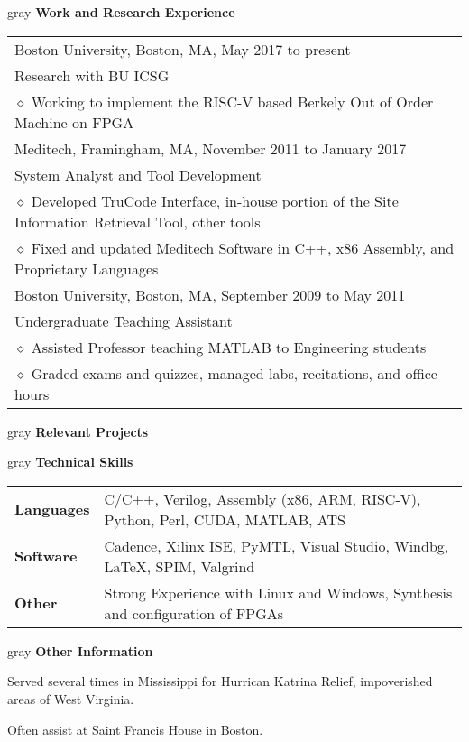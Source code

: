 \documentclass[11pt,letterpaper]{article}
\newcommand{\pseudoitem}{\diamond}
\newcommand{\vertspace}{\vspace{1.2mm}}
\newcommand{\horzindent}{\hspace{3mm}}
\newcommand{\minoritem}{\hspace{4.5mm} $\pseudoitem$ }
\newcommand{\latex}{\LaTeX\space}
\newcommand{\undergrad}{Boston University}
\newcommand{\grad}{Boston University}
\begin{document}
	\vertspace
	\noindent
	\begin{heading}{gray}
		\textbf{Work and Research Experience} 
	\end{heading}
		\begin{tabular}{l}
			\grad , Boston, MA, May 2017 to present\\
			\horzindent Research with BU ICSG\\
			\minoritem Working to implement the RISC-V based Berkely Out of Order Machine on FPGA\\
			Meditech, Framingham, MA, November 2011 to January 2017\\
			\horzindent System Analyst and Tool Development \\
			\minoritem Developed TruCode Interface, in-house portion of the Site Information Retrieval Tool, other tools \\
			\minoritem Fixed and updated Meditech Software in C++, x86 Assembly, and Proprietary Languages \\
			\undergrad , Boston, MA, September 2009 to May 2011 \\
			\horzindent Undergraduate Teaching Assistant \\
			\minoritem Assisted Professor teaching MATLAB to Engineering students \\
			\minoritem Graded exams and quizzes, managed labs, recitations, and office hours \\
		\end{tabular}
		
	\vertspace
	\noindent
	\begin{heading}{gray}
		\textbf{Relevant Projects}
	\end{heading}
	
	\vertspace
	\noindent
	\begin{heading}{gray}
		\textbf{Technical Skills}
	\end{heading}
	\begin{tabular}{l|l}
		\textbf{Languages} & C/C++, Verilog, Assembly (x86, ARM, RISC-V), Python, Perl, CUDA, MATLAB, ATS \\
		\textbf{Software} & Cadence, Xilinx ISE, PyMTL, Visual Studio, Windbg, \latex, SPIM, Valgrind \\
		\textbf{Other} & Strong Experience with Linux and Windows, Synthesis and configuration of FPGAs
	\end{tabular}
	
	\vertspace
	\noindent
	\begin{heading}{gray}
		\textbf{Other Information}
	\end{heading}
	Served several times in Mississippi for Hurrican Katrina Relief, impoverished areas of West Virginia.
	
	Often assist at Saint Francis House in Boston.
\end{document}

